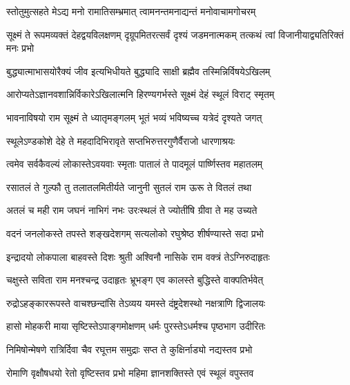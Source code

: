 


\addtocounter{shlokacount}{29}

\twolineshloka
{स्तोतुमुत्सहते मेऽद्य मनो रामातिसम्भ्रमात्}
{त्वामनन्तमनाद्यन्तं मनोवाचामगोचरम्} %

\threelineshloka
{सूक्ष्मं ते रूपमव्यक्तं देहद्वयविलक्षणम्}
{दृग्रूपमितरत्सर्वं दृश्यं जडमनात्मकम्}
{तत्कथं त्वां विजानीयाद्व्यतिरिक्तं मनः प्रभो} %

\twolineshloka
{बुद्ध्यात्माभासयोरैक्यं जीव इत्यभिधीयते}
{बुद्ध्यादि साक्षी ब्रह्मैव तस्मिन्निर्विषयेऽखिलम्} %

\twolineshloka
{आरोप्यतेऽज्ञानवशान्निर्विकारेऽखिलात्मनि}
{हिरण्यगर्भस्ते सूक्ष्मं देहं स्थूलं विराट् स्मृतम्} %

\twolineshloka
{भावनाविषयो राम सूक्ष्मं ते ध्यातृमङ्गलम्}
{भूतं भव्यं भविष्यच्च यत्रेदं दृश्यते जगत्} %

\twolineshloka
{स्थूलेऽण्डकोशे देहे ते महदादिभिरावृते}
{सप्तभिरुत्तरगुणैर्वैराजो धारणाश्रयः} %

\twolineshloka
{त्वमेव सर्वकैवल्यं लोकास्तेऽवयवाः स्मृताः}
{पातालं ते पादमूलं पार्ष्णिस्तव महातलम्} %

\twolineshloka
{रसातलं ते गुल्फौ तु तलातलमितीर्यते}
{जानुनी सुतलं राम ऊरू ते वितलं तथा} %

\twolineshloka
{अतलं च मही राम जघनं नाभिगं नभः}
{उरःस्थलं ते ज्योतींषि ग्रीवा ते मह उच्यते} %

\twolineshloka
{वदनं जनलोकस्ते तपस्ते शङ्खदेशगम्}
{सत्यलोको रघुश्रेष्ठ शीर्षण्यास्ते सदा प्रभो} %

\twolineshloka
{इन्द्रादयो लोकपाला बाहवस्ते दिशः श्रुती}
{अश्विनौ नासिके राम वक्त्रं तेऽग्निरुदाहृतः} %

\twolineshloka
{चक्षुस्ते सविता राम मनश्चन्द्र उदाहृतः}
{भ्रूभङ्ग एव कालस्ते बुद्धिस्ते वाक्पतिर्भवेत्} %

\twolineshloka
{रुद्रोऽहङ्काररूपस्ते वाचश्छन्दांसि तेऽव्यय}
{यमस्ते दंष्ट्रदेशस्थो नक्षत्राणि द्विजालयः} %

\twolineshloka
{हासो मोहकरी माया सृष्टिस्तेऽपाङ्गमोक्षणम्}
{धर्मः पुरस्तेऽधर्मश्च पृष्ठभाग उदीरितः} %

\twolineshloka
{निमिषोन्मेषणे रात्रिर्दिवा चैव रघूत्तम}
{समुद्राः सप्त ते कुक्षिर्नाड्यो नद्यस्तव प्रभो} %

\twolineshloka
{रोमाणि वृक्षौषधयो रेतो वृष्टिस्तव प्रभो}
{महिमा ज्ञानशक्तिस्ते एवं स्थूलं वपुस्तव} %

